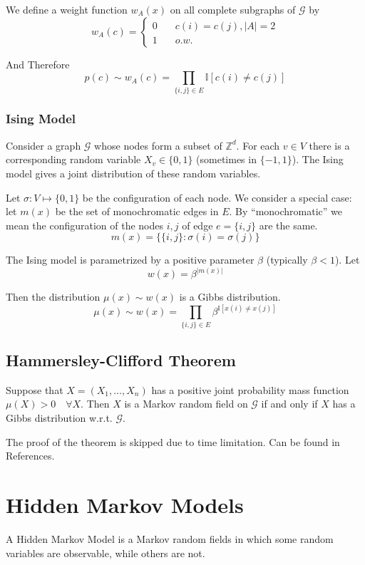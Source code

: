        We define a weight function $w_A(x)$ on all complete subgraphs of $\mathcal{G}$ by
        \[ w_A(c) = \begin{cases}
            0 &\quad c(i) = c(j), |A|=2\\
            1 &\quad o.w.
        \end{cases} \]

        And Therefore
        \[ p(c) \sim w_A(c) = \prod_{\{i,j\} \in E}\mathbb{I}[c(i) \neq c(j)] \]

        \subsubsection{Ising Model}
        Consider a graph $\mathcal{G}$ whose nodes form a subset of $\mathbb{Z}^d$. For each $v \in V$ there is a corresponding random variable $X_v \in \{0,1\}$ (sometimes in $\{-1,1\}$). The Ising model gives a joint distribution of these random variables.

        Let $\sigma: V \mapsto \{0,1\}$ be the configuration of each node. We consider a special case: let $m(x)$ be the set of monochromatic edges in $E$. By ``monochromatic'' we mean the configuration of the nodes $i,j$ of edge $e=\{i,j\}$ are the same.
        \[ m(x) = \{\{i,j\}: \sigma(i) = \sigma(j)\} \]

        The Ising model is parametrized by a positive parameter $\beta$ (typically $\beta < 1$). Let
        \[ w(x) = \beta^{|m(x)|} \]

        Then the distribution $\mu(x) \sim w(x)$ is a Gibbs distribution.
        \[ \mu(x) \sim w(x) = \prod_{\{i,j\} \in E}\beta^{\mathbb{I}[x(i)\neq x(j)]} \]

    \subsection{Hammersley-Clifford Theorem}
        \begin{theorem}\label{thm:HammersleyClifford}
            Suppose that $X=(X_1,\dots,X_n)$ has a positive joint probability mass function $\mu(X) > 0 \quad \forall X$. Then $X$ is a Markov random field on $\mathcal{G}$ if and only if $X$ has a Gibbs distribution w.r.t. $\mathcal{G}$.
        \end{theorem}

        The proof of the theorem is skipped due to time limitation. Can be found in References.


\section{Hidden Markov Models}
    A Hidden Markov Model is a Markov random fields in which some random variables are observable, while others are not.


